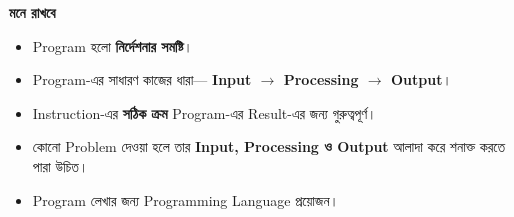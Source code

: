 \begin{rememberbox}

\textbf{\color{deepOrange}মনে রাখবে}

\begin{itemize}

\item Program হলো \textbf{নির্দেশনার সমষ্টি}।

\item Program-এর সাধারণ কাজের ধারা—
\textbf{Input \(\rightarrow\) Processing \(\rightarrow\) Output}।

\item Instruction-এর \textbf{সঠিক ক্রম} Program-এর Result-এর জন্য গুরুত্বপূর্ণ।

\item কোনো Problem দেওয়া হলে তার \textbf{Input, Processing ও Output}
আলাদা করে শনাক্ত করতে পারা উচিত।

\item Program লেখার জন্য Programming Language প্রয়োজন।

\end{itemize}

\end{rememberbox}

\small

